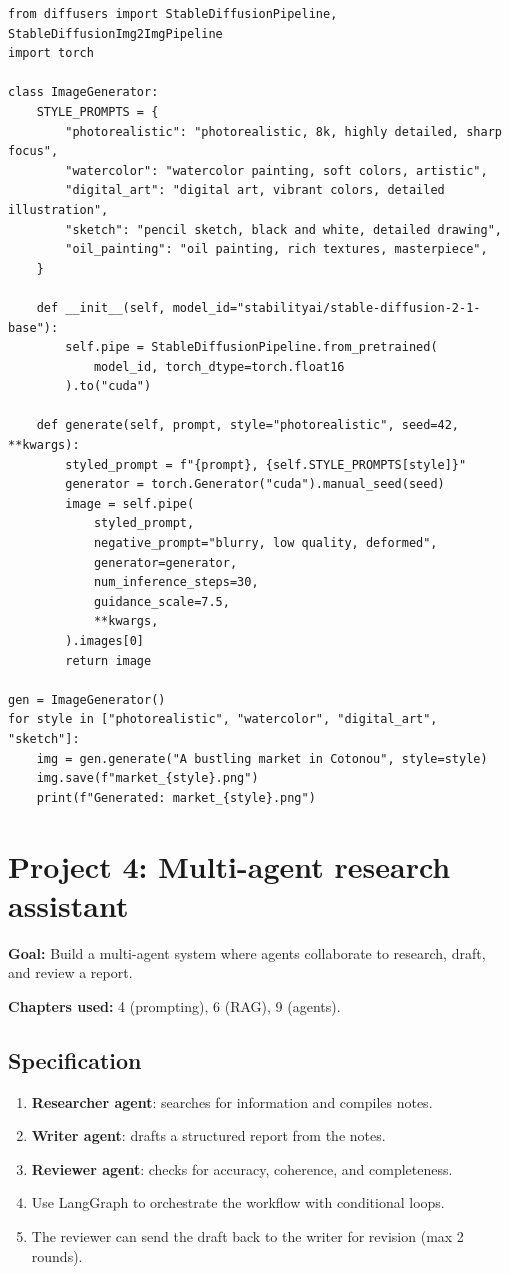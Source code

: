 \begin{verbatim}
from diffusers import StableDiffusionPipeline, StableDiffusionImg2ImgPipeline
import torch

class ImageGenerator:
    STYLE_PROMPTS = {
        "photorealistic": "photorealistic, 8k, highly detailed, sharp focus",
        "watercolor": "watercolor painting, soft colors, artistic",
        "digital_art": "digital art, vibrant colors, detailed illustration",
        "sketch": "pencil sketch, black and white, detailed drawing",
        "oil_painting": "oil painting, rich textures, masterpiece",
    }

    def __init__(self, model_id="stabilityai/stable-diffusion-2-1-base"):
        self.pipe = StableDiffusionPipeline.from_pretrained(
            model_id, torch_dtype=torch.float16
        ).to("cuda")

    def generate(self, prompt, style="photorealistic", seed=42, **kwargs):
        styled_prompt = f"{prompt}, {self.STYLE_PROMPTS[style]}"
        generator = torch.Generator("cuda").manual_seed(seed)
        image = self.pipe(
            styled_prompt,
            negative_prompt="blurry, low quality, deformed",
            generator=generator,
            num_inference_steps=30,
            guidance_scale=7.5,
            **kwargs,
        ).images[0]
        return image

gen = ImageGenerator()
for style in ["photorealistic", "watercolor", "digital_art", "sketch"]:
    img = gen.generate("A bustling market in Cotonou", style=style)
    img.save(f"market_{style}.png")
    print(f"Generated: market_{style}.png")
\end{verbatim}

\section{Project 4: Multi-agent research assistant}

\textbf{Goal:} Build a multi-agent system where agents collaborate to research, draft, and review a report.

\textbf{Chapters used:} 4 (prompting), 6 (RAG), 9 (agents).

\subsection{Specification}

\begin{enumerate}
  \item \textbf{Researcher agent}: searches for information and compiles notes.
  \item \textbf{Writer agent}: drafts a structured report from the notes.
  \item \textbf{Reviewer agent}: checks for accuracy, coherence, and completeness.
  \item Use LangGraph to orchestrate the workflow with conditional loops.
  \item The reviewer can send the draft back to the writer for revision (max 2 rounds).
\end{enumerate}

